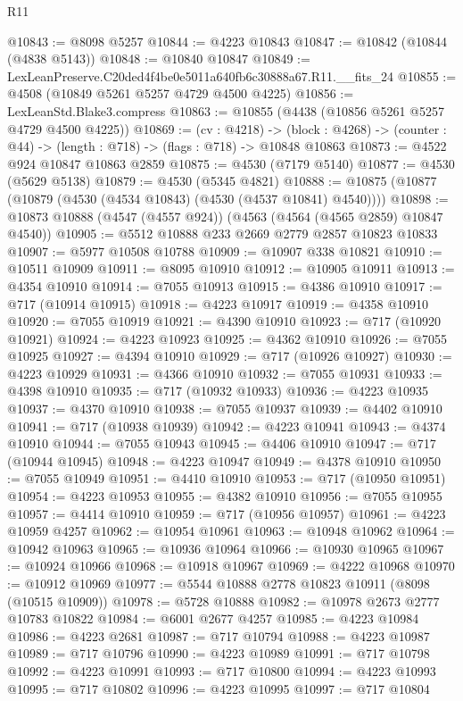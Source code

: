\begin{lexlean}{R11}
\begin{coremodule}
@10843 := @8098 @5257
@10844 := @4223 @10843
@10847 := @10842 (@10844 (@4838 @5143))
@10848 := @10840 @10847
@10849 := LexLeanPreserve.C20ded4f4be0e5011a640fb6c30888a67.R11.__fits_24
@10855 := @4508 (@10849 @5261 @5257 @4729 @4500 @4225)
@10856 := LexLeanStd.Blake3.compress
@10863 := @10855 (@4438 (@10856 @5261 @5257 @4729 @4500 @4225))
@10869 := (cv : @4218) ->
  (block : @4268) -> (counter : @44) -> (length : @718) -> (flags : @718) -> @10848 @10863
@10873 := @4522 @924 @10847 @10863 @2859
@10875 := @4530 (@7179 @5140)
@10877 := @4530 (@5629 @5138)
@10879 := @4530 (@5345 @4821)
@10888 := @10875 (@10877 (@10879 (@4530 (@4534 @10843) (@4530 (@4537 @10841) @4540))))
@10898 := @10873 @10888 (@4547 (@4557 @924)) (@4563 (@4564 (@4565 @2859) @10847 @4540))
@10905 := @5512 @10888 @233 @2669 @2779 @2857 @10823 @10833
@10907 := @5977 @10508 @10788
@10909 := @10907 @338 @10821
@10910 := @10511 @10909
@10911 := @8095 @10910
@10912 := @10905 @10911
@10913 := @4354 @10910
@10914 := @7055 @10913
@10915 := @4386 @10910
@10917 := @717 (@10914 @10915)
@10918 := @4223 @10917
@10919 := @4358 @10910
@10920 := @7055 @10919
@10921 := @4390 @10910
@10923 := @717 (@10920 @10921)
@10924 := @4223 @10923
@10925 := @4362 @10910
@10926 := @7055 @10925
@10927 := @4394 @10910
@10929 := @717 (@10926 @10927)
@10930 := @4223 @10929
@10931 := @4366 @10910
@10932 := @7055 @10931
@10933 := @4398 @10910
@10935 := @717 (@10932 @10933)
@10936 := @4223 @10935
@10937 := @4370 @10910
@10938 := @7055 @10937
@10939 := @4402 @10910
@10941 := @717 (@10938 @10939)
@10942 := @4223 @10941
@10943 := @4374 @10910
@10944 := @7055 @10943
@10945 := @4406 @10910
@10947 := @717 (@10944 @10945)
@10948 := @4223 @10947
@10949 := @4378 @10910
@10950 := @7055 @10949
@10951 := @4410 @10910
@10953 := @717 (@10950 @10951)
@10954 := @4223 @10953
@10955 := @4382 @10910
@10956 := @7055 @10955
@10957 := @4414 @10910
@10959 := @717 (@10956 @10957)
@10961 := @4223 @10959 @4257
@10962 := @10954 @10961
@10963 := @10948 @10962
@10964 := @10942 @10963
@10965 := @10936 @10964
@10966 := @10930 @10965
@10967 := @10924 @10966
@10968 := @10918 @10967
@10969 := @4222 @10968
@10970 := @10912 @10969
@10977 := @5544 @10888 @2778 @10823 @10911 (@8098 (@10515 @10909))
@10978 := @5728 @10888
@10982 := @10978 @2673 @2777 @10783 @10822
@10984 := @6001 @2677 @4257
@10985 := @4223 @10984
@10986 := @4223 @2681
@10987 := @717 @10794
@10988 := @4223 @10987
@10989 := @717 @10796
@10990 := @4223 @10989
@10991 := @717 @10798
@10992 := @4223 @10991
@10993 := @717 @10800
@10994 := @4223 @10993
@10995 := @717 @10802
@10996 := @4223 @10995
@10997 := @717 @10804

\end{coremodule}
\end{lexlean}
